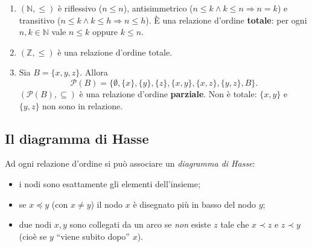 \documentclass[11pt,a4paper]{article}
\begin{document}
\begin{esempio}
\leavevmode
\begin{enumerate}
    \item $(\mathbb{N}, \leq)$ è riflessivo ($n \leq n$), antisimmetrico
          ($n \leq k \land k \leq n \Rightarrow n = k$) e transitivo
          ($n \leq k \land k \leq h \Rightarrow n \leq h$). È una
          relazione d'ordine \textbf{totale}: per ogni $n, k \in
          \mathbb{N}$ vale $n \leq k$ oppure $k \leq n$.

    \item $(\mathbb{Z}, \leq)$ è una relazione d'ordine totale.

    \item Sia $B = \{x, y, z\}$. Allora
          \[
          \mathcal{P}(B) = \big\{\emptyset, \{x\}, \{y\}, \{z\},
          \{x,y\}, \{x,z\}, \{y,z\}, B\big\}.
          \]
          $(\mathcal{P}(B), \subseteq)$ è una relazione d'ordine
          \textbf{parziale}. Non è totale: $\{x, y\}$ e $\{y, z\}$ non
          sono in relazione.
\end{enumerate}
\end{esempio}

\subsection{Il diagramma di Hasse}

\begin{osservazione}
Ad ogni relazione d'ordine si può associare un \emph{diagramma di Hasse}:
\begin{itemize}
    \item i nodi sono esattamente gli elementi dell'insieme;
    \item se $x \preceq y$ (con $x \neq y$) il nodo $x$ è disegnato più in
          basso del nodo $y$;
    \item due nodi $x, y$ sono collegati da un arco se \emph{non} esiste
          $z$ tale che $x \prec z$ e $z \prec y$ (cioè se $y$ ``viene
          subito dopo'' $x$).
\end{itemize}
\end{osservazione}
\end{document}
